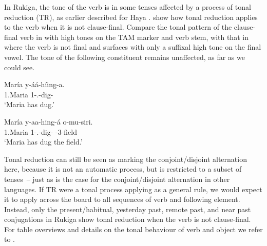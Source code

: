\documentclass[output=paper]{langscibook}
\begin{document}
In Rukiga, the tone of the verb is in some tenses affected by a process of tonal reduction (TR), as earlier described for Haya \citep{Hyman1999}.  show how tonal reduction applies to the verb when it is not clause-final. Compare the tonal pattern of the clause-final verb in  with high tones on the TAM marker and verb stem, with that in  where the verb is not final and surfaces with only a suffixal high tone on the final vowel. The tone of the following constituent remains unaffected, as far as we could see.

\ea
\label{bkm:Ref99000590}
\ea
\begin{xlist}[TR]
\exi{~}
\label{bkm:Ref99000590:a}
\gll
María  y-áá-híing-a.\\
1.Maria  1\SM{}-\N{}.\PST{}-dig-\FV{}\\
\glt
‘Maria has dug.’\\
\end{xlist}

\ex
\label{bkm:Ref99000590:b}
\begin{xlist}[TR]
\gll
María  y-aa-hing-á  o-mu-siri.{\footnotemark} \\
1.Maria  1\SM{}-\N{}.\PST{}-dig-\FV{}  \AUG{}-3-field\\
\glt
‘Maria has dug the field.’\\
\citep[44]{vanderWalAsiimwe2020}
\end{xlist}

\z
\z


Tonal reduction can still be seen as marking the conjoint/disjoint alternation here, because it is not an automatic process, but is restricted to a subset of tenses~-- just as is the case for the conjoint/disjoint alternation in other languages. If TR were a tonal process applying as a general rule, we would expect it to apply across the board to all sequences of verb and following element. Instead, only the present/habitual, yesterday past, remote past, and near past conjugations in Rukiga show tonal reduction when the verb is not clause-final. For table overviews and details on the tonal behaviour of verb and object we refer to \citet{vanderWalAsiimwe2020}.
\end{document}
